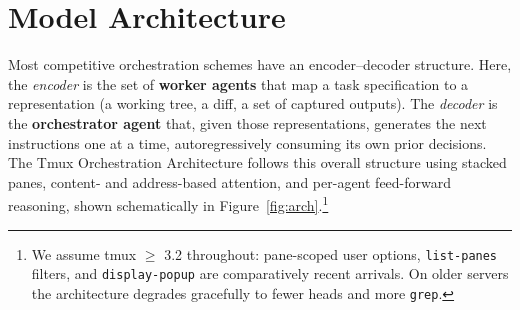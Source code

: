 \documentclass[10pt]{article}
\newcommand{\code}[1]{\texttt{\small #1}}
\begin{document}
\section{Model Architecture}\label{sec:arch}

Most competitive orchestration schemes have an encoder--decoder structure. Here, the
\emph{encoder} is the set of \textbf{worker agents} that map a task specification to a
representation (a working tree, a diff, a set of captured outputs). The \emph{decoder}
is the \textbf{orchestrator agent} that, given those representations, generates the
next instructions one at a time, autoregressively consuming its own prior decisions.
The Tmux Orchestration Architecture follows this overall structure using stacked
panes, content- and address-based attention, and per-agent feed-forward reasoning,
shown schematically in Figure~\ref{fig:arch}.\footnote{We assume tmux $\geq$ 3.2
throughout: pane-scoped user options, \code{list-panes} filters, and
\code{display-popup} are comparatively recent arrivals. On older servers the
architecture degrades gracefully to fewer heads and more \code{grep}.}
\end{document}
